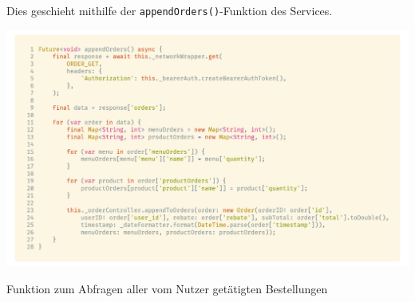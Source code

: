 Dies geschieht mithilfe der \lstinline{appendOrders()}-Funktion des Services.

\begin{code}
    \centering
    \includegraphics[width=1\textwidth]{images/Client/services/manage-orders/appendOrders.png}
    \caption{Funktion zum Abfragen aller vom Nutzer getätigten Bestellungen}
\end{code}